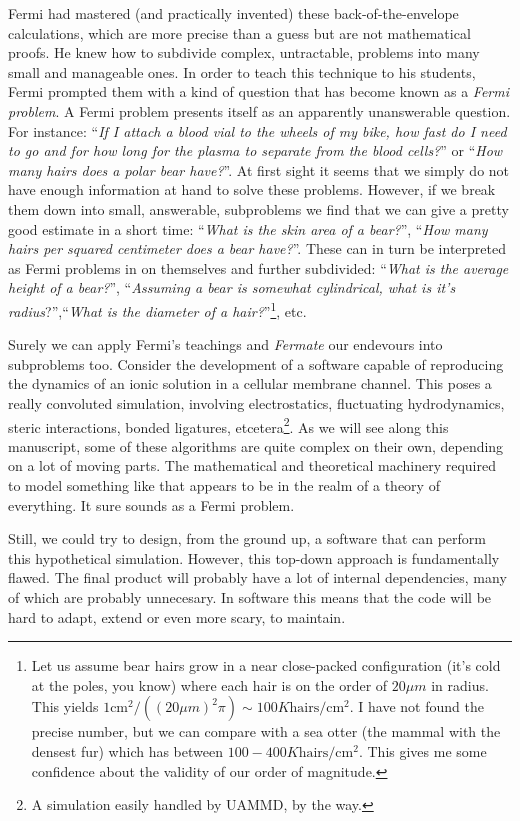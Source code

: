 \documentclass[ twoside,openright,titlepage,numbers=noenddot,%
headinclude,footinclude,cleardoublepage=empty,abstract=on,
BCOR=5mm,paper=a4,fontsize=11pt, dvipsnames
]{scrreprt}
\newcommand{\uammd}{\gls{UAMMD}\xspace}
\begin{document}
Fermi had mastered (and practically invented) these back-of-the-envelope calculations, which are more precise than a guess but are not mathematical proofs. He knew how to subdivide complex, untractable, problems into many small and manageable ones. In order to teach this technique to his students, Fermi prompted them with a kind of question that has become known as a \emph{Fermi problem}. A Fermi problem presents itself as an apparently unanswerable question. For instance: ``\emph{If I attach a blood vial to the wheels of my bike, how fast do I need to go and for how long for the plasma to separate from the blood cells?}'' or ``\emph{How many hairs does a polar bear have?}''. At first sight it seems that we simply do not have enough information at hand to solve these problems. However, if we break them down into small, answerable, subproblems we find that we can give a pretty good estimate in a short time: ``\emph{What is the skin area of a bear?}'', ``\emph{How many hairs per squared centimeter does a bear have?}''. These can in turn be interpreted as Fermi problems in on themselves and further subdivided: ``\emph{What is the average height of a bear?}'', ``\emph{Assuming a bear is somewhat cylindrical, what is it's radius}?'',``\emph{What is the diameter of a hair?}''\footnote{Let us assume bear hairs grow in a near close-packed configuration (it's cold at the poles, you know) where each hair is on the order of $20\mu m$ in radius. This yields $1\text{cm}^2/((20\mu m)^2\pi) \sim 100K \text{hairs}/\text{cm}^2$. I have not found the precise number, but we can compare with a sea otter (the mammal with the densest fur) which has between $100-400K \text{hairs}/\text{cm}^2$. This gives me some confidence about the validity of our order of magnitude.}, etc.

Surely we can apply Fermi's teachings and \emph{Fermate} our endevours into subproblems too.
Consider the development of a software capable of reproducing the dynamics of an ionic solution in a cellular membrane channel. This poses a really convoluted simulation, involving electrostatics, fluctuating hydrodynamics, steric interactions, bonded ligatures, etcetera\footnote{A simulation easily handled by \uammd, by the way.}. As we will see along this manuscript, some of these algorithms are quite complex on their own, depending on a lot of moving parts. The mathematical and theoretical machinery required to model something like that appears to be in the realm of a theory of everything. It sure sounds as a Fermi problem.

Still, we could try to design, from the ground up, a software that can perform this hypothetical simulation. 
However, this top-down approach is fundamentally flawed. The final product will probably have a lot of internal dependencies, many of which are probably unnecesary. In software this means that the code will be hard to adapt, extend or even more scary, to maintain.
\end{document}
